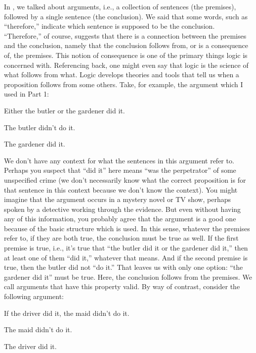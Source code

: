 In , we talked about arguments, i.e., a collection of sentences (the premises), followed by a single sentence (the conclusion). We said that some words, such as “therefore,” indicate which sentence is supposed to be the conclusion. “Therefore,” of course, suggests that there is a connection between the premises and the conclusion, namely that the conclusion follows from, or is a consequence of, the premises. This notion of consequence is one of the primary things logic is concerned with. Referencing back, one might even say that logic is the science of what follows from what. Logic develops theories and tools that tell us when a proposition follows from some others. Take, for example, the argument which I used in Part 1:
\begin{earg}
	\item[] Either the butler or the gardener did it.
	\item[] The butler didn't do it.
	\item[\therefore] The gardener did it.
\end{earg}
We don’t have any context for what the sentences in this argument refer to. Perhaps you suspect that “did it” here means “was the perpetrator” of some unspecified crime (we don't necessarily know what the correct proposition is for that sentence in this context because we don't know the context). You might imagine that the argument occurs in a mystery novel or TV show, perhaps spoken by a detective working through the evidence. But even without having any of this information, you probably agree that the argument is a good one because of the basic structure which is used. In this sense, whatever the premises refer to, if they are both true, the conclusion must be true as well. If the first premise is true, i.e., it’s true that “the butler did it or the gardener did it,” then at least one of them “did it,” whatever that means. And if the second premise is true, then the butler did not “do it.” That leaves us with only one option: “the gardener did it” must be true. Here, the conclusion follows from the premises. We call arguments that have this property \gls{valid}.
By way of contrast, consider the following argument:
\begin{earg}\label{argMaidDriver}
	\item[] If the driver did it, the maid didn't do it.
	\item[] The maid didn't do it.
	\item[\therefore] The driver did it.
\end{earg}
